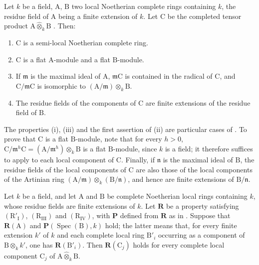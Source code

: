\begin{lemma}[7.5.5]
\label{IV.7.5.5}
Let $k$ be a field, $\mathrm{A}$, $\mathrm{B}$ two local Noetherian complete rings containing $k$, the residue field of $\mathrm{A}$ being a finite extension of $k$. Let $\mathrm{C}$ be the completed tensor product $\mathrm{A}\widehat{\otimes}_k\mathrm{B}$ . Then:
\begin{enumerate}[label=(\roman*)]
  \item $\mathrm{C}$ is a semi-local Noetherian complete ring.
  \item $\mathrm{C}$ is a flat $\mathrm{A}$-module and a flat $\mathrm{B}$-module.
  \item If $\mathfrak{m}$ is the maximal ideal of $\mathrm{A}$, $\mathfrak{m}\mathrm{C}$ is contained in the radical of $\mathrm{C}$, and $\mathrm{C}/\mathfrak{m}\mathrm{C}$ is isomorphic to $(\mathrm{A}/\mathfrak{m})\otimes_k\mathrm{B}$.
  \item The residue fields of the components of $\mathrm{C}$ are finite extensions of the residue field of $\mathrm{B}$.
\end{enumerate}
\end{lemma}

The properties (i), (iii) and the first assertion of (ii) are particular cases of . To prove that $\mathrm{C}$ is a flat $\mathrm{B}$-module, note that for every $h>0$, $\mathrm{C}/\mathfrak{m}^h\mathrm{C}
=(\mathrm{A}/\mathfrak{m}^h)\otimes_k\mathrm{B}$
is a flat $\mathrm{B}$-module, since $k$ is a field; it therefore suffices to apply  to each local component of $\mathrm{C}$. Finally, if $\mathfrak{n}$ is the maximal ideal of $\mathrm{B}$, the residue fields of the local components of $\mathrm{C}$ are also those of the local components of the Artinian ring $(\mathrm{A}/\mathfrak{m})\otimes_k(\mathrm{B}/\mathfrak{n})$, and hence are finite extensions of $\mathrm{B}/\mathfrak{n}$.

\begin{proposition}[7.5.6]
\label{IV.7.5.6}
Let $k$ be a field, and let $\mathrm{A}$ and $\mathrm{B}$ be complete Noetherian local rings containing $k$, whose residue fields are finite extensions of $k$. Let $\boldsymbol{R}$ be a property satisfying $(\mathrm{R}'_{\mathrm{I}})$, $(\mathrm{R}_{\mathrm{III}})$ and $(\mathrm{R}_{\mathrm{IV}})$, with $\boldsymbol{P}$ defined from $\boldsymbol{R}$ as in . Suppose that $\boldsymbol{R}(\mathrm{A})$ and $\boldsymbol{P}(\operatorname{Spec}(\mathrm{B}),k)$ hold; the latter means that, for every finite extension $k'$ of $k$ and each complete local ring $\mathrm{B}'_i$ occurring as a component of $\mathrm{B}\otimes_k k'$, one has $\boldsymbol{R}(\mathrm{B}'_i)$. Then $\boldsymbol{R}(\mathrm{C}_j)$ holds for every complete local component $\mathrm{C}_j$ of $\mathrm{A}\widehat{\otimes}_k\mathrm{B}$.
\end{proposition}

